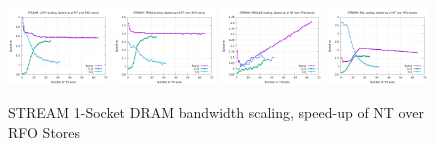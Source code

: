 \documentclass{article}
\begin{document}
\begin{figure}[!ht]
    \centering
    \includegraphics[width=0.24\textwidth]{../mem_bw_scale/mb_scale_compact_Copy_nt_rfo}
    \includegraphics[width=0.24\textwidth]{../mem_bw_scale/mb_scale_compact_Triad_nt_rfo}
    \includegraphics[width=0.24\textwidth]{../mem_bw_scale/mb_scale_compact_Reduce_nt_rfo}
    \includegraphics[width=0.24\textwidth]{../mem_bw_scale/mb_scale_compact_Fill_nt_rfo}
    \caption{STREAM 1-Socket DRAM bandwidth scaling, speed-up of NT over RFO Stores}
    \label{figure:mem_bw_scale_compact_nt_rfo}
\end{figure}
\end{document}
